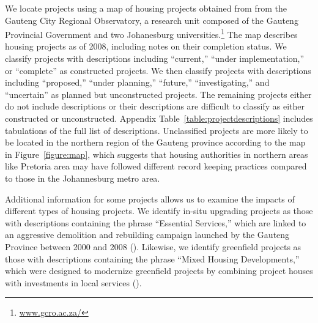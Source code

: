 \documentclass[12pt]{article}
\begin{document}
We locate projects using a map of housing projects obtained from from the Gauteng City Regional Observatory, a research unit composed of the Gauteng Provincial Government and two Johanesburg universities.\footnote{\href{url}{www.gcro.ac.za/}} The map describes housing projects as of 2008, including notes on their completion status.  We classify projects with descriptions including ``current,'' ``under implementation,'' or ``complete'' as constructed projects.  We then classify projects with descriptions including ``proposed,'' ``under planning,'' ``future,'' ``investigating,'' and ``uncertain'' as planned but unconstructed projects.  The remaining projects either do not include descriptions or their descriptions are difficult to classify as either constructed or unconstructed.  Appendix Table~\ref{table:projectdescriptions} includes tabulations of the full list of descriptions.  Unclassified projects are more likely to be located in the northern region of the Gauteng province according to the map in Figure~\ref{figure:map}, which suggests that housing authorities in northern areas like Pretoria area may have followed different record keeping practices compared to those in the Johannesburg metro area.  

Additional information for some projects allows us to examine the impacts of different types of housing projects.  We identify in-situ upgrading projects as those with descriptions containing the phrase ``Essential Services,'' which are linked to an aggressive demolition and rebuilding campaign launched by the Gauteng Province between 2000 and 2008 (\cite{hofmeyr2008risk}).  Likewise, we identify greenfield projects as those with descriptions containing the phrase ``Mixed Housing Developments,'' which were designed to modernize greenfield projects by combining project houses with investments in local services (\cite{greenfield}).
\end{document}

